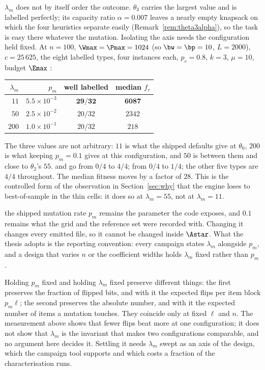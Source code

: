 $\lambda_m$ does not by itself order the outcome. $\theta_3$ carries the largest value and is
labelled perfectly; its capacity ratio $\alpha=0.007$ leaves a nearly empty knapsack on which
the four heuristics separate easily (Remark~\ref{rem:theta3alpha}), so the task is easy there
whatever the mutation. Isolating the axis needs the configuration held fixed. At $n=100$,
$\Wmax=\Pmax=1024$ (so $\bw=\bp=10$, $L=2000$), $c=25\,625$, the eight labelled types, four
instances each, $p_c=0.8$, $k=3$, $\mu=10$, budget $\Emax$ :

\begin{center}\small
\begin{tabular}{@{}rrcc@{}}
\toprule
$\lambda_m$ & $p_m$ & well labelled & median $f_\tau$ \\
\midrule
$11$  & $5.5\times10^{-3}$ & $\mathbf{29/32}$ & $\mathbf{6087}$ \\
$50$  & $2.5\times10^{-2}$ & $20/32$ & $2342$ \\
$200$ & $1.0\times10^{-1}$ & $20/32$ & $218$ \\
\bottomrule
\end{tabular}
\end{center}

The three values are not arbitrary: $11$ is what the shipped defaults give at $\theta_0$,
$200$ is what keeping $p_m=0.1$ gives at this configuration, and $50$ is between them and
close to $\theta_2$'s $55$.  and  go from $0/4$ to
$4/4$;  from $0/4$ to $1/4$; the other five types are $4/4$
throughout. The median fitness moves by a factor of $28$. This is the controlled form of the
observation in Section~\ref{sec:why} that the engine loses to best-of-sample in the thin
cells: it does so at $\lambda_m=55$, not at $\lambda_m=11$.

\begin{kept}{the shipped mutation rate}
$p_m$ remains the parameter the code exposes, and $0.1$ remains what the grid and the
reference set were recorded with. Changing it changes every emitted file, so it cannot be
changed inside $\Astar$. What the thesis adopts is the reporting convention: every campaign
states $\lambda_m$ alongside $p_m$, and a design that varies $n$ or the coefficient widths
holds $\lambda_m$ fixed rather than $p_m$.
\end{kept}

\begin{remark}\label{rem:lambdaopen}
Holding $p_m$ fixed and holding $\lambda_m$ fixed preserve different things: the first
preserves the fraction of flipped bits, and with it the expected flips per item block
$p_m\ell$; the second preserves the absolute number, and with it the expected number of items
a mutation touches. They coincide only at fixed $\ell$ and $n$. The measurement above shows
that fewer flips beat more at one configuration; it does not show that $\lambda_m$ is the
invariant that makes two configurations comparable, and no argument here decides it. Settling
it needs $\lambda_m$ swept as an axis of the design, which the campaign tool supports and
which costs a fraction of the characterisation runs.
\end{remark}


